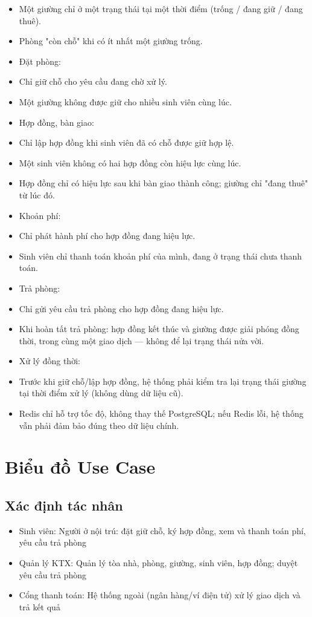 \begin{itemize}[leftmargin=1.4em]
\item Một giường chỉ ở một trạng thái tại một thời điểm (trống / đang giữ / đang thuê).
\item Phòng "còn chỗ" khi có ít nhất một giường trống.
\item Đặt phòng:
\item Chỉ giữ chỗ cho yêu cầu đang chờ xử lý.
\item Một giường không được giữ cho nhiều sinh viên cùng lúc.
\item Hợp đồng, bàn giao:
\item Chỉ lập hợp đồng khi sinh viên đã có chỗ được giữ hợp lệ.
\item Một sinh viên không có hai hợp đồng còn hiệu lực cùng lúc.
\item Hợp đồng chỉ có hiệu lực sau khi bàn giao thành công; giường chỉ "đang thuê" từ lúc đó.
\item Khoản phí:
\item Chỉ phát hành phí cho hợp đồng đang hiệu lực.
\item Sinh viên chỉ thanh toán khoản phí của mình, đang ở trạng thái chưa thanh toán.
\item Trả phòng:
\item Chỉ gửi yêu cầu trả phòng cho hợp đồng đang hiệu lực.
\item Khi hoàn tất trả phòng: hợp đồng kết thúc và giường được giải phóng đồng thời, trong cùng một giao dịch — không để lại trạng thái nửa vời.
\item Xử lý đồng thời:
\item Trước khi giữ chỗ/lập hợp đồng, hệ thống phải kiểm tra lại trạng thái giường tại thời điểm xử lý (không dùng dữ liệu cũ).
\item Redis chỉ hỗ trợ tốc độ, không thay thế PostgreSQL; nếu Redis lỗi, hệ thống vẫn phải đảm bảo đúng theo dữ liệu chính.
\end{itemize}


\section{Biểu đồ Use Case}

\subsection{Xác định tác nhân}

\begin{itemize}[leftmargin=1.4em]
\item Sinh viên: Người ở nội trú: đặt giữ chỗ, ký hợp đồng, xem và thanh toán phí, yêu cầu trả phòng
\item Quản lý KTX: Quản lý tòa nhà, phòng, giường, sinh viên, hợp đồng; duyệt yêu cầu trả phòng
\item Cổng thanh toán: Hệ thống ngoài (ngân hàng/ví điện tử) xử lý giao dịch và trả kết quả
\end{itemize}

